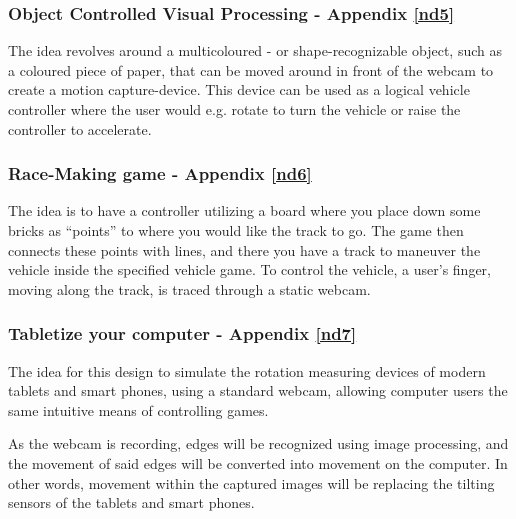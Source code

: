 \subsubsection{Object Controlled Visual Processing - Appendix \ref{nd5}}
The idea revolves around a multicoloured - or shape-recognizable object, such as a coloured piece of paper, that can be moved around in front of the webcam to create a motion capture-device. This device can be used as a logical vehicle controller where the user would e.g. rotate to turn the vehicle or raise the controller to accelerate.

\subsubsection{Race-Making game - Appendix \ref{nd6}}
The idea is to have a controller utilizing a board where you place down some bricks as “points” to where you would like the track to go. The game then connects these points with lines, and there you have a track to maneuver the vehicle inside the specified vehicle game. To control the vehicle, a user’s finger, moving along the track, is traced through a static webcam.

\subsubsection{Tabletize your computer - Appendix \ref{nd7}}
The idea for this design to simulate the rotation measuring devices of modern tablets and smart phones, using a standard webcam, allowing computer users the same intuitive means of controlling games.

As the webcam is recording, edges will be recognized using image processing, and the movement of said edges will be converted into movement on the computer. In other words, movement within the captured images will be replacing the tilting sensors of the tablets and smart phones.

